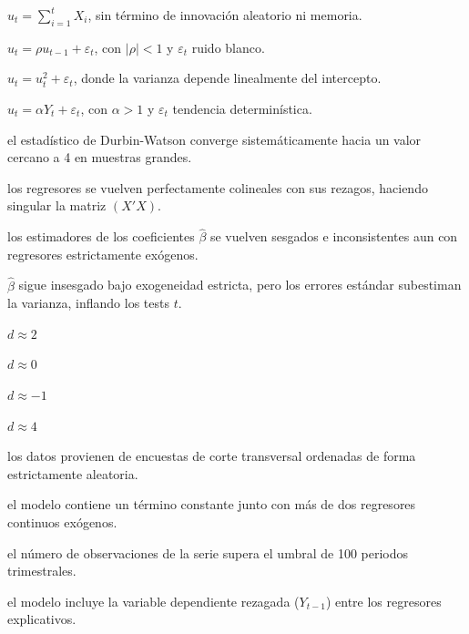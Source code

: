 \begin{opts}
    \item $u_t = \sum_{i=1}^t X_i$, sin término de innovación aleatorio ni memoria.
    \item $u_t = \rho u_{t-1} + \varepsilon_t$, con $|\rho| < 1$ y $\varepsilon_t$ ruido blanco.
    \item $u_t = u_t^2 + \varepsilon_t$, donde la varianza depende linealmente del intercepto.
    \item $u_t = \alpha Y_t + \varepsilon_t$, con $\alpha > 1$ y $\varepsilon_t$ tendencia determinística.
\end{opts}

\begin{opts}
    \item el estadístico de Durbin-Watson converge sistemáticamente hacia un valor cercano a 4 en muestras grandes.
    \item los regresores se vuelven perfectamente colineales con sus rezagos, haciendo singular la matriz $(X'X)$.
    \item los estimadores de los coeficientes $\hat{\beta}$ se vuelven sesgados e inconsistentes aun con regresores estrictamente exógenos.
    \item $\hat{\beta}$ sigue insesgado bajo exogeneidad estricta, pero los errores estándar subestiman la varianza, inflando los tests $t$.
\end{opts}

\begin{opts}
    \item $d \approx 2$
    \item $d \approx 0$
    \item $d \approx -1$
    \item $d \approx 4$
\end{opts}

\begin{opts}
    \item los datos provienen de encuestas de corte transversal ordenadas de forma estrictamente aleatoria.
    \item el modelo contiene un término constante junto con más de dos regresores continuos exógenos.
    \item el número de observaciones de la serie supera el umbral de 100 periodos trimestrales.
    \item el modelo incluye la variable dependiente rezagada ($Y_{t-1}$) entre los regresores explicativos.
\end{opts}

